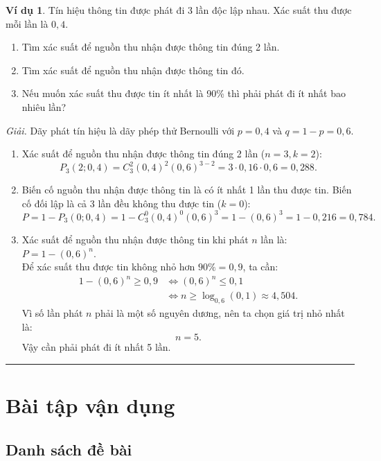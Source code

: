 \documentclass[12pt,a4paper]{article}
\theoremstyle{definition}
\newtheorem{vidu}{Ví dụ}[section]
\begin{document}
\begin{vidu}
Tín hiệu thông tin được phát đi 3 lần độc lập nhau. Xác suất thu được mỗi lần là $0{,}4$.
\begin{enumerate}[label=\alph*)]
    \item Tìm xác suất để nguồn thu nhận được thông tin đúng 2 lần.
    \item Tìm xác suất để nguồn thu nhận được thông tin đó.
    \item Nếu muốn xác suất thu được tin ít nhất là 90\% thì phải phát đi ít nhất bao nhiêu lần?
\end{enumerate}
\textit{Giải.} Dãy phát tín hiệu là dãy phép thử Bernoulli với $p = 0{,}4$ và $q = 1 - p = 0{,}6$.
\begin{enumerate}[label=\alph*)]
    \item Xác suất để nguồn thu nhận được thông tin đúng 2 lần ($n = 3, k = 2$):
    \[
    P_3(2; 0{,}4) = C_3^2 (0{,}4)^2 (0{,}6)^{3 - 2} = 3 \cdot 0{,}16 \cdot 0{,}6 = 0{,}288.
    \]
    \item Biến cố nguồn thu nhận được thông tin là có ít nhất 1 lần thu được tin. Biến cố đối lập là cả 3 lần đều không thu được tin ($k = 0$):
    \[
    P = 1 - P_3(0; 0{,}4) = 1 - C_3^0 (0{,}4)^0 (0{,}6)^3 = 1 - (0{,}6)^3 = 1 - 0{,}216 = 0{,}784.
    \]
    \item Xác suất để nguồn thu nhận được thông tin khi phát $n$ lần là: $P = 1 - (0{,}6)^n$.\\
    Để xác suất thu được tin không nhỏ hơn $90\% = 0{,}9$, ta cần:
    \begin{align*}
    1 - (0{,}6)^n \ge 0{,}9 &\iff (0{,}6)^n \le 0{,}1 \\
                           &\iff n \ge \log_{0{,}6}(0{,}1) \approx 4{,}504.
    \end{align*}
    Vì số lần phát $n$ phải là một số nguyên dương, nên ta chọn giá trị nhỏ nhất là:
    \[
    n = 5.
    \]
    Vậy cần phải phát đi ít nhất 5 lần.
\end{enumerate}
\end{vidu}

\vspace{1em}
\hrule
\vspace{1.5em}

\section{Bài tập vận dụng}

\subsection{Danh sách đề bài}
\end{document}
